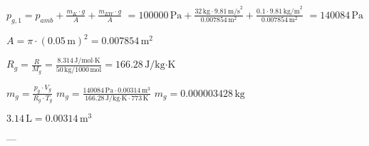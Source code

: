 \( p_{g,1} = p_{amb} + \frac{m_K \cdot g}{A} + \frac{m_{EW} \cdot g}{A} \)  
\( = 100000 \, \text{Pa} + \frac{32 \, \text{kg} \cdot 9.81 \, \text{m/s}^2}{0.007854 \, \text{m}^2} + \frac{0.1 \cdot 9.81 \, \text{kg/m}^2}{0.007854 \, \text{m}^2} \)  
\( = 140084 \, \text{Pa} \)  

\( A = \pi \cdot (0.05 \, \text{m})^2 = 0.007854 \, \text{m}^2 \)  

\( R_g = \frac{R}{M_g} = \frac{8.314 \, \text{J/mol·K}}{50 \, \text{kg}/1000 \, \text{mol}} = 166.28 \, \text{J/kg·K} \)  

\( m_g = \frac{p_g \cdot V_g}{R_g \cdot T_g} \)  
\( m_g = \frac{140084 \, \text{Pa} \cdot 0.00314 \, \text{m}^3}{166.28 \, \text{J/kg·K} \cdot 773 \, \text{K}} \)  
\( m_g = 0.000003428 \, \text{kg} \)  

\( 3.14 \, \text{L} = 0.00314 \, \text{m}^3 \)  

---